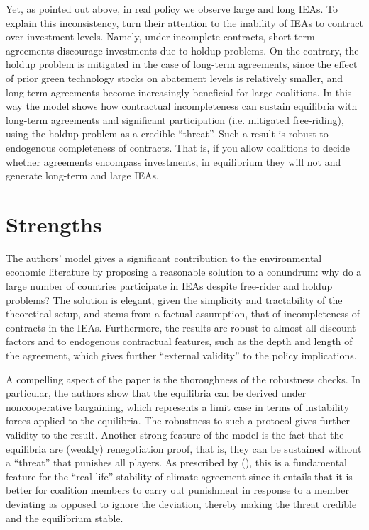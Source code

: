 \documentclass[american]{scrartcl}
\newcommand{\citein}[1]{\citeauthor{#1} (\citeyear{#1})}
\begin{document}
Yet, as pointed out above, in real policy we observe large and long IEAs. To explain this inconsistency, \citeauthor{Battaglini2016} turn their attention to the inability of IEAs to contract over investment levels. Namely, under incomplete contracts, short-term agreements discourage investments due to holdup problems. On the contrary, the holdup problem is mitigated in the case of long-term agreements, since the effect of prior green technology stocks on abatement levels is relatively smaller, and long-term agreements become increasingly beneficial for large coalitions. In this way the model shows how contractual incompleteness can sustain equilibria with long-term agreements and significant participation (i.e. mitigated free-riding), using the holdup problem as a credible ``threat''. Such a result is robust to endogenous completeness of contracts. That is, if you allow coalitions to decide whether agreements encompass investments, in equilibrium they will not and generate long-term and large IEAs.

\section{Strengths}

The authors' model gives a significant contribution to the environmental economic literature by proposing a reasonable solution to a conundrum: why do a large number of countries participate in IEAs despite free-rider and holdup problems? The solution is elegant, given the simplicity and tractability of the theoretical setup, and stems from a factual assumption, that of incompleteness of contracts in the IEAs. Furthermore, the results are robust to almost all discount factors and to endogenous contractual features, such as the depth and length of the agreement, which gives further ``external validity'' to the policy implications.

A compelling aspect of the paper is the thoroughness of the robustness checks. In particular, the authors show that the equilibria can be derived under noncooperative bargaining, which represents a limit case in terms of instability forces applied to the equilibria. The robustness to such a protocol gives further validity to the result. Another strong feature of the model is the fact that the equilibria are (weakly) renegotiation proof, that is, they can be sustained without a ``threat'' that punishes all players. As prescribed by \citein{Barrett2005}, this is a fundamental feature for the ``real life'' stability of climate agreement since it entails that it is better for coalition members to carry out punishment in response to a member deviating as opposed to ignore the deviation, thereby making the threat credible and the equilibrium stable.
\end{document}
